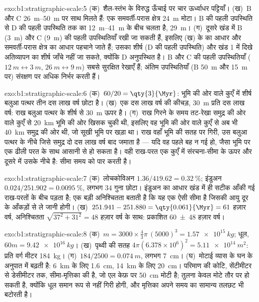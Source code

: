 \begin{solution}{exo:b1:stratigraphic-scale:5}
(क)~शैल-स्तंभ के विरुद्ध ऊँचाई पर चार ऊर्ध्वाधर पट्टियाँ। (ख)~B और C \qtyrange{26}{50}{m}
पर साथ मिलते हैं: एक समवर्ती-परास क्षेत्र \qty{24}{m} मोटा। B की पहली उपस्थिति से
D की पहली उपस्थिति तक का  \qtyrange{12}{41}{m} के बीच चलता है, \qty{29}{m}।
(ग)~दूसरे खंड में B (\qty{3}{m}) और C (\qty{9}{m}) की पहली उपस्थितियाँ रखी जा सकती
हैं, इसलिए (ख) के  का आधार और समवर्ती-परास क्षेत्र का आधार पहचाने
जाते हैं; उसका शीर्ष (D की पहली उपस्थिति) और खंड 1 में दिखे अतिव्यापन का शीर्ष जाँचे
नहीं जा सकते, क्योंकि D अनुपस्थित है। B और C की पहली उपस्थितियाँ ($\qty{12}{m} \leftrightarrow
\qty{3}{m}$, $\qty{26}{m} \leftrightarrow \qty{9}{m}$) सबसे सुरक्षित रेखाएँ हैं; अंतिम उपस्थितियाँ
(B \qty{50}{m} और \qty{15}{m} पर) संरक्षण पर अधिक निर्भर करती हैं।
\end{solution}

\begin{solution}{exo:b1:stratigraphic-scale:6}
(क)~$60/20 = \qty{3}{\Myr}$: भूमि की ओर वाले कुएँ में शीर्ष बलुआ पत्थर तीन दस लाख
वर्ष छोटा है। (ख)~एक दस लाख वर्ष की कीचड़, \qty{30}{m} प्रति दस लाख वर्ष: राख
बलुआ पत्थर के शीर्ष से \qty{30}{m} ऊपर है। (ग)~राख गिरने के समय तट-रेखा समुद्र की
ओर वाले कुएँ से \qty{20}{km} भूमि की ओर खिसक चुकी थी, इसलिए वह भूमि की ओर वाले कुएँ
से अब भी \qty{40}{km} समुद्र की ओर थी, जो सूखी भूमि पर खड़ा था। राख वहाँ भूमि की
सतह पर गिरी, उस बलुआ पत्थर के नीचे जिसे समुद्र दो दस लाख वर्ष बाद जमाता है ---
यदि वह पहले बह न गई हो, जैसा भूमि पर एक ढीली परत के साथ आसानी से हो सकता है। वही
राख-परत एक कुएँ में संरचना-सीमा के ऊपर और दूसरे में उसके नीचे है: सीमा समय को पार
करती है।
\end{solution}

\begin{solution}{exo:b1:stratigraphic-scale:7}
(क)~लोचकोविअन $1.36/419.62 = \qty{0.32}{\%}$; इंडुअन $0.024/251.902 =
\qty{0.0095}{\%}$,
लगभग 34 गुना छोटा। इंडुअन का आधार  खंड में ही सटीक आँकी गई राख-परतों के बीच पड़ता
है; एक बड़ी अनिश्चितता बताती है कि यह एक ऐसी सीमा है जिसकी आयु दूर के आँकड़ों से
ले जानी होगी। (ख)~$251.941 - 251.880 = \qty{0.061}{\Myr} = 61$ हज़ार वर्ष, अनिश्चितता
$\sqrt{37^2 + 31^2} = 48$ हज़ार वर्ष के साथ: प्रकाशित
\num[uncertainty-mode=separate]{60 \pm 48} हज़ार वर्ष।
\end{solution}

\begin{solution}{exo:b1:stratigraphic-scale:8}
(क)~$m = 3000 \times \frac43\pi\,(5000)^3 = \qty{1.57e15}{kg}$; धूल, $60m = \qty{9.42e16}{kg}$।
(ख)~पृथ्वी की सतह $4\pi(6.378\times10^6)^2
= \qty{5.11e14}{m^2}$: प्रति वर्ग मीटर \qty{184}{kg}। (ग)~$184/2500 =
\qty{0.074}{m}$, लगभग \qty{7}{cm}। (घ)~मोटाई व्यास के घन के अनुपात में बढ़ती है:
\qty{6}{km} के लिए \qty{1.6}{cm}, \qty{14}{km} के लिए \qty{20}{cm}। परिमाण की कोटि,
सेंटीमीटर से डेसीमीटर तक, सीमा-मृत्तिका की है, जो एल केफ़ पर \qty{50}{cm} मोटी है;
तुलना केवल मोटे तौर पर हो सकती है, क्योंकि धूल समान रूप से नहीं गिरी होगी, और
मृत्तिका अपने समय का सामान्य तलछट भी बटोरती है।
\end{solution}

